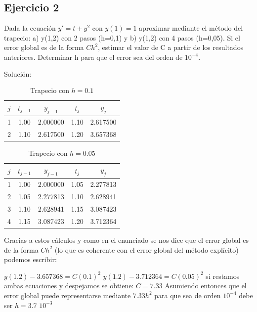\documentclass{article}
\theoremstyle{theorem-style}  %
\theoremstyle{definition-style}
\theoremstyle{example-style}
\begin{document}
\subsection{Ejercicio 2} \label{ejtp2}

Dada la ecuación $y'=t+y^2$ con $y(1)=1$ aproximar mediante el método del trapecio: a) y(1,2) con 2 pasos (h=0,1) y b) y(1,2) con 4 pasos (h=0,05). Si el error global es de la forma $Ch^2$, estimar el valor de C a partir de los resultados anteriores. Determinar h para que el error sea del orden de $10^{-4}$.

Solución:

    \begin{table}[H]
		\centering
		\begin{tabular}{|| c | c | c | c | c ||}
			\hline
			\hline $j$ &  $t_{j-1}$ & $y_{j-1}$ & $t_j$ & $y_j$ \\
			\hline 1 & 1.00 & 2.000000 & 1.10 & 2.617500 \\
			\hline 2 & 1.10 & 2.617500 & 1.20 & 3.657368 \\
		\end{tabular}
		\caption{Trapecio con $h=0.1$}
		\label{table:trapecio-ej2}
	\end{table}

	 \begin{table}[H]
		\centering
		\begin{tabular}{|| c | c | c | c | c ||}
			\hline
			\hline $j$ &  $t_{j-1}$ & $y_{j-1}$ & $t_j$ & $y_j$ \\
			\hline 1 & 1.00 & 2.000000 & 1.05 & 2.277813 \\
			\hline 2 & 1.05 & 2.277813 & 1.10 & 2.628941 \\
			\hline 3 & 1.10 & 2.628941 & 1.15 & 3.087423 \\
			\hline 4 & 1.15 & 3.087423 & 1.20 & 3.712364 \\
		\end{tabular}
		\caption{Trapecio con $h=0.05$}
		\label{table:trapecio-ej2.1}
	\end{table}

	Gracias a estos cálculos y como en el enunciado se nos dice que el error global es de la forma $Ch^2$ (lo que es coherente con el error global del método explícito) podemos escribir:

	$y(1.2) - 3.657368 = C(0.1)^2$
	$y(1.2) - 3.712364 = C(0.05)^2$
si restamos ambas ecuaciones y despejamos se obtiene:
	$C=7.33$
	Asumiendo entonces que el error global puede representarse mediante $7.33 h^2$ para que sea de orden $10^{-4}$ debe ser $h=3.7$ $10^{-3}$
\end{document}

